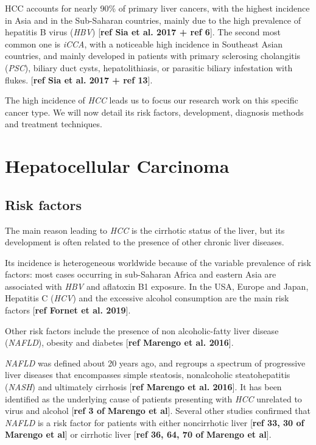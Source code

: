 \documentclass[]{article}
\begin{document}
HCC accounts for nearly 90\% of primary liver cancers, with the highest
incidence in Asia and in the Sub-Saharan countries, mainly due to the
high prevalence of hepatitis B virus (\emph{HBV}) {[}\textbf{ref Sia et
al. 2017 + ref 6}{]}. The second most common one is \emph{iCCA}, with a
noticeable high incidence in Southeast Asian countries, and mainly
developed in patients with primary sclerosing cholangitis (\emph{PSC}),
biliary duct cysts, hepatolithiasis, or parasitic biliary infestation
with flukes. {[}\textbf{ref Sia et al. 2017 + ref 13}{]}.

The high incidence of \emph{HCC} leads us to focus our research work on
this specific cancer type. We will now detail its risk factors,
development, diagnosis methods and treatment techniques.

\section{Hepatocellular Carcinoma}\label{hepatocellular-carcinoma}

\subsection{Risk factors}\label{risk-factors}

The main reason leading to \emph{HCC} is the cirrhotic status of the
liver, but its development is often related to the presence of other
chronic liver diseases.

Its incidence is heterogeneous worldwide because of the variable
prevalence of risk factors: most cases occurring in sub-Saharan Africa
and eastern Asia are associated with \emph{HBV} and aflatoxin B1
exposure. In the USA, Europe and Japan, Hepatitis C (\emph{HCV}) and the
excessive alcohol consumption are the main risk factors {[}\textbf{ref
Fornet et al. 2019}{]}.

Other risk factors include the presence of non alcoholic-fatty liver
disease (\emph{NAFLD}), obesity and diabetes {[}\textbf{ref Marengo et
al. 2016}{]}.

\emph{NAFLD} was defined about 20 years ago, and regroups a spectrum of
progressive liver diseases that encompasses simple steatosis,
nonalcoholic steatohepatitis (\emph{NASH}) and ultimately cirrhosis
{[}\textbf{ref Marengo et al. 2016}{]}. It has been identified as the
underlying cause of patients presenting with \emph{HCC} unrelated to
virus and alcohol {[}\textbf{ref 3 of} \textbf{Marengo et al}{]}.
Several other studies confirmed that \emph{NAFLD} is a risk factor for
patients with either noncirrhotic liver {[}\textbf{ref 33, 30 of}
\textbf{Marengo et al}{]} or cirrhotic liver {[}\textbf{ref 36, 64, 70
of} \textbf{Marengo et al}{]}.
\end{document}
